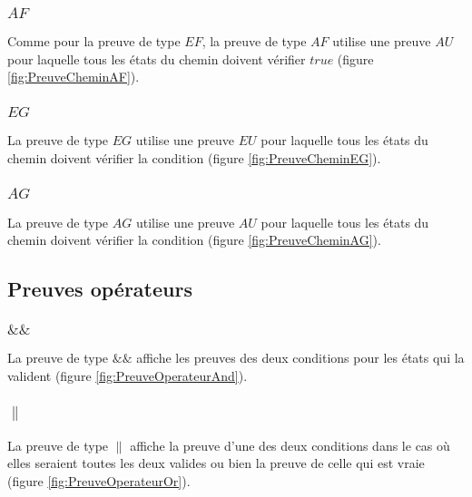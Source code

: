 \documentclass[dvipsnames]{report}
\begin{document}


\subsubsection{$AF$}

Comme pour la preuve de type $EF$, la preuve de type $AF$ utilise une preuve $AU$ pour laquelle tous les états du chemin doivent vérifier $true$ (figure \ref{fig:PreuveCheminAF}).



\subsubsection{$EG$}

La preuve de type $EG$ utilise une preuve $EU$ pour laquelle tous les états du chemin doivent vérifier la condition (figure \ref{fig:PreuveCheminEG}).



\subsubsection{$AG$}

La preuve de type $AG$ utilise une preuve $AU$ pour laquelle tous les états du chemin doivent vérifier la condition (figure \ref{fig:PreuveCheminAG}).



\subsection{Preuves opérateurs}

\subsubsection{$\&\&$}

La preuve de type $\&\&$ affiche les preuves des deux conditions pour les états qui la valident (figure \ref{fig:PreuveOperateurAnd}).



\subsubsection{$\|$}

La preuve de type $\|$ affiche la preuve d'une des deux conditions dans le cas où elles seraient toutes les deux valides ou bien la preuve de celle qui est vraie (figure \ref{fig:PreuveOperateurOr}).
\end{document}
